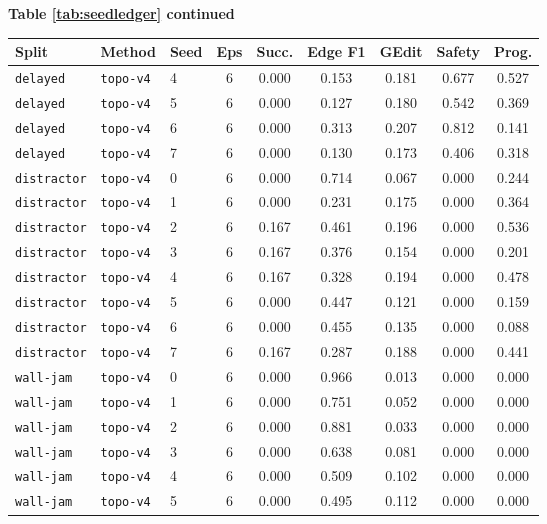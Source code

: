\documentclass{article}
\begin{document}
\begin{center}
\textbf{Table \ref{tab:seedledger} continued}\\[0.4ex]
\begin{tabular}{lllcccccc}
\toprule
Split & Method & Seed & Eps & Succ. & Edge F1 & GEdit & Safety & Prog. \\
\midrule
\texttt{delayed} & \texttt{topo-v4} & 4 & 6 & 0.000 & 0.153 & 0.181 & 0.677 & 0.527 \\
\texttt{delayed} & \texttt{topo-v4} & 5 & 6 & 0.000 & 0.127 & 0.180 & 0.542 & 0.369 \\
\texttt{delayed} & \texttt{topo-v4} & 6 & 6 & 0.000 & 0.313 & 0.207 & 0.812 & 0.141 \\
\texttt{delayed} & \texttt{topo-v4} & 7 & 6 & 0.000 & 0.130 & 0.173 & 0.406 & 0.318 \\
\texttt{distractor} & \texttt{topo-v4} & 0 & 6 & 0.000 & 0.714 & 0.067 & 0.000 & 0.244 \\
\texttt{distractor} & \texttt{topo-v4} & 1 & 6 & 0.000 & 0.231 & 0.175 & 0.000 & 0.364 \\
\texttt{distractor} & \texttt{topo-v4} & 2 & 6 & 0.167 & 0.461 & 0.196 & 0.000 & 0.536 \\
\texttt{distractor} & \texttt{topo-v4} & 3 & 6 & 0.167 & 0.376 & 0.154 & 0.000 & 0.201 \\
\texttt{distractor} & \texttt{topo-v4} & 4 & 6 & 0.167 & 0.328 & 0.194 & 0.000 & 0.478 \\
\texttt{distractor} & \texttt{topo-v4} & 5 & 6 & 0.000 & 0.447 & 0.121 & 0.000 & 0.159 \\
\texttt{distractor} & \texttt{topo-v4} & 6 & 6 & 0.000 & 0.455 & 0.135 & 0.000 & 0.088 \\
\texttt{distractor} & \texttt{topo-v4} & 7 & 6 & 0.167 & 0.287 & 0.188 & 0.000 & 0.441 \\
\texttt{wall-jam} & \texttt{topo-v4} & 0 & 6 & 0.000 & 0.966 & 0.013 & 0.000 & 0.000 \\
\texttt{wall-jam} & \texttt{topo-v4} & 1 & 6 & 0.000 & 0.751 & 0.052 & 0.000 & 0.000 \\
\texttt{wall-jam} & \texttt{topo-v4} & 2 & 6 & 0.000 & 0.881 & 0.033 & 0.000 & 0.000 \\
\texttt{wall-jam} & \texttt{topo-v4} & 3 & 6 & 0.000 & 0.638 & 0.081 & 0.000 & 0.000 \\
\texttt{wall-jam} & \texttt{topo-v4} & 4 & 6 & 0.000 & 0.509 & 0.102 & 0.000 & 0.000 \\
\texttt{wall-jam} & \texttt{topo-v4} & 5 & 6 & 0.000 & 0.495 & 0.112 & 0.000 & 0.000 \\

\end{tabular}
\end{center}
\end{document}
